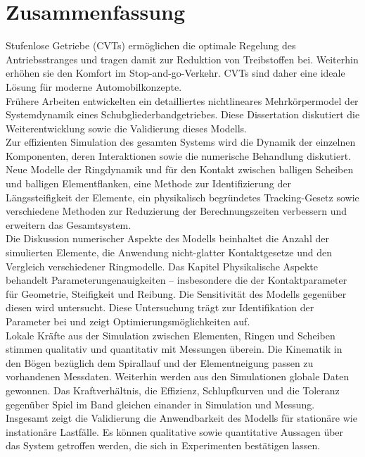 \section*{Zusammenfassung}
Stufenlose Getriebe (CVTs) ermöglichen die optimale Regelung des Antriebsstranges und tragen damit zur Reduktion von Treibstoffen bei.
Weiterhin erhöhen sie den Komfort im Stop-and-go-Verkehr.
CVTs sind daher eine ideale Lösung für moderne Automobilkonzepte.\\
Frühere Arbeiten entwickelten ein detailliertes nichtlineares Mehrkörpermodel der Systemdynamik eines Schubgliederbandgetriebes.
Diese Dissertation diskutiert die Weiterentwicklung sowie die Validierung dieses Modells.\\
Zur effizienten Simulation des gesamten Systems wird die Dynamik der einzelnen Komponenten, deren Interaktionen sowie die numerische Behandlung diskutiert.
Neue Modelle der Ringdynamik und für den Kontakt zwischen balligen Scheiben und balligen Elementflanken, eine Methode zur Identifizierung der Längs\-steifigkeit der Elemente, ein physikalisch begründetes \glqq Tracking\grqq-Gesetz sowie verschiedene Methoden zur Reduzierung der Berechnungszeiten verbessern und erweitern das Gesamtsystem.\\
Die Diskussion numerischer Aspekte des Modells beinhaltet die Anzahl der simulierten Elemente, die Anwendung nicht-glatter Kontaktgesetze und den Vergleich verschiedener Ringmodelle.
Das Kapitel \glqq Physikalische Aspekte\grqq\xspace behandelt Parameterungenauigkeiten -- insbesondere die der Kontaktparameter für Geometrie, Steifigkeit und Reibung.
Die Sensitivität des Modells gegenüber diesen wird untersucht.
Diese Untersuchung trägt zur Identifikation der Parameter bei und zeigt Optimierungsmöglichkeiten auf.\\
Lokale Kräfte aus der Simulation zwischen Elementen, Ringen und Scheiben stimmen qualitativ und quantitativ mit Messungen überein.
Die Kinematik in den Bögen bezüglich dem Spirallauf und der Elementneigung passen zu vorhandenen Messdaten.
Weiterhin werden aus den Simulationen globale Daten gewonnen.
Das Kraftverhältnis, die Effizienz, \glqq Schlupfkurven\grqq\xspace und die Toleranz gegenüber Spiel im Band gleichen einander in Simulation und Messung.
Insgesamt zeigt die Validierung die Anwendbarkeit des Modells für stationäre wie instationäre Lastfälle.
Es können qualitative sowie quantitative Aussagen über das System getroffen werden, die sich in Experimenten bestätigen lassen. 
\vfill
{}


